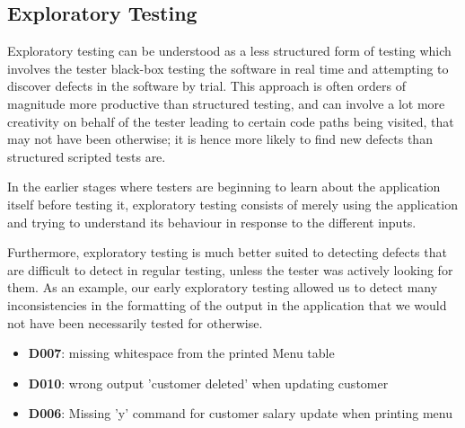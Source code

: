 \subsection{Exploratory Testing}

Exploratory testing can be understood as a less structured form of testing which involves the tester black-box testing the software in real time and attempting to discover defects in the software by trial. 
This approach is often orders of magnitude more productive than structured testing, and can involve a lot more creativity on behalf of the tester leading to certain code paths being visited, that may not have been otherwise; it is hence more likely to find new defects than structured scripted tests are.
\par
In the earlier stages where testers are beginning to learn about the application itself before testing it, exploratory testing consists of merely using the application and trying to understand its behaviour in response to the different inputs. 
\par
Furthermore, exploratory testing is much better suited to detecting defects that are difficult to detect in regular testing, unless the tester was actively looking for them. 
As an example, our early exploratory testing allowed us to detect many inconsistencies in the formatting of the output in the application that we would not have been necessarily tested for otherwise.  

\begin{itemize}
    \item \textbf{D007}: missing whitespace from the printed Menu table
    \item \textbf{D010}: wrong output 'customer deleted' when updating customer
    \item \textbf{D006}: Missing 'y' command for customer salary update when printing menu
\end{itemize}